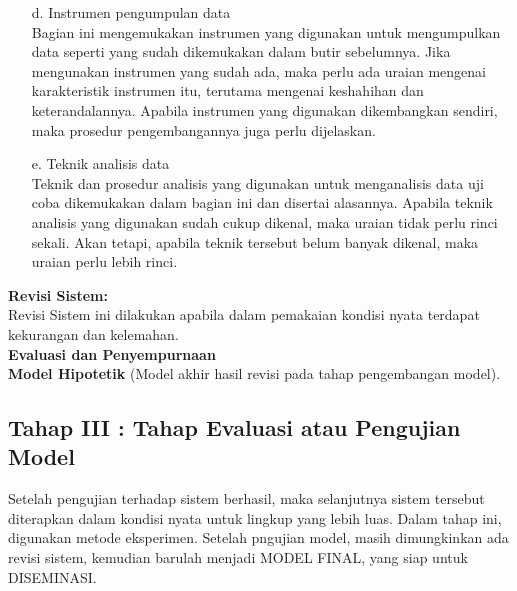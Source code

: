 \documentclass{jtetiproposalskripsi}
\begin{document}
\begin{itemize}
\item[d.] Instrumen pengumpulan data\\
Bagian ini mengemukakan instrumen yang digunakan untuk mengumpulkan data seperti yang sudah dikemukakan dalam butir sebelumnya. Jika mengunakan instrumen yang sudah ada, maka  perlu ada uraian mengenai karakteristik instrumen itu, terutama mengenai keshahihan dan keterandalannya. Apabila instrumen  yang digunakan dikembangkan sendiri, maka prosedur pengembangannya juga perlu dijelaskan. 
\item[e.] Teknik analisis data \\  
Teknik dan prosedur analisis yang digunakan untuk menganalisis data uji coba dikemukakan dalam bagian ini dan disertai alasannya. Apabila teknik analisis yang digunakan sudah cukup dikenal, maka uraian tidak perlu rinci sekali. Akan tetapi, apabila teknik tersebut belum banyak dikenal, maka uraian perlu lebih rinci.
\end{itemize}
\textbf{Revisi Sistem:}\\
Revisi Sistem ini dilakukan apabila dalam pemakaian kondisi nyata terdapat kekurangan dan kelemahan. \\
\textbf{Evaluasi dan Penyempurnaan}\\
\textbf{Model Hipotetik} (Model akhir hasil revisi pada tahap pengembangan model).
\subsection{Tahap III : Tahap Evaluasi atau Pengujian Model}
Setelah pengujian terhadap sistem berhasil, maka selanjutnya sistem tersebut diterapkan dalam kondisi nyata untuk lingkup yang lebih luas. Dalam tahap ini, digunakan metode eksperimen. Setelah pngujian model, masih dimungkinkan ada revisi sistem, kemudian barulah menjadi MODEL FINAL, yang siap untuk DISEMINASI.
\newpage
\end{document}
